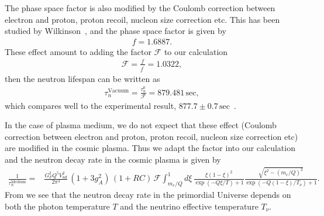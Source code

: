 The phase space factor is also modified by the Coulomb correction between electron and proton, proton recoil, nucleon size correction etc. This has been studied by Wilkinson~\cite{Wilkinson:1982hu}, and the phase space factor is given by~\cite{Czarnecki:2018okw,Czarnecki:2004cw,Wilkinson:1982hu}
\begin{align}
f=1.6887.
\end{align}
These effect amount to adding the factor $\mathcal{F}$ to our calculation
\begin{align}
\mathcal{F}=\frac{f}{f^\prime}=1.0322,
\end{align}
then the neutron lifespan can be written as 
\begin{align}
\tau^{\mathrm{Vacuum}}_n=\frac{\tau^0_n}{\mathcal{F}}=879.481\,\mathrm{sec},
\end{align}
which compares well to the experimental result, $877.7\pm0.7\,\mathrm{sec}$~\cite{Pattie:2017vsj}. 

In the case of plasma medium, we do not expect that these effect (Coulomb correction between electron and proton, proton recoil, nucleon size correction etc) are modified in the cosmic plasma. Thus we adapt the factor into our calculation and the neutron decay rate in the cosmic plasma is given by
\begin{align}
\label{Decay_rate_02}
\frac{1}{\tau_n^{\mathrm{Medium}}}=&\frac{G^2_FQ^5V^2_{ud}}{2\pi^3}\,(1+3g^2_A)\,(1+RC)\,\mathcal{F}
\int^1_{m_e/Q}d\xi\,\frac{\xi(1-\xi)^2}{\exp\left(-Q\xi/{T}\right)+1}\frac{\sqrt{\xi^2-(m_e/Q)^2}}{\exp\left(-Q(1-\xi)/T_\nu\right)+1}.
\end{align}
From  we see that the neutron decay rate in the primordial Universe depends on both the photon temperature $T$ and the neutrino effective temperature $T_\nu$.

